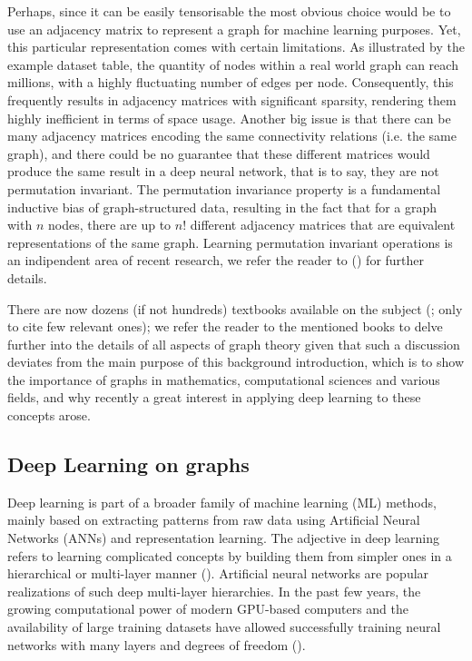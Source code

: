 \documentclass[binding=0.6cm]{sapthesis}
\newcommand{\mycite}[1]{(\cite{#1})}
\begin{document}
Perhaps, since it can be easily tensorisable the most obvious choice would be to use an adjacency matrix to represent a graph for machine learning purposes. Yet, this particular representation comes with certain limitations. As illustrated by the example dataset table, the quantity of nodes within a real world graph can reach millions, with a highly fluctuating number of edges per node. Consequently, this frequently results in adjacency matrices with significant sparsity, rendering them highly inefficient in terms of space usage. Another big issue is that there can be many adjacency matrices encoding the same connectivity relations (i.e. the same graph), and there could be no guarantee that these different matrices would produce the same result in a deep neural network, that is to say, they are not permutation invariant. The permutation invariance property is a fundamental inductive bias of graph-structured data, resulting in the fact that for a graph with $n$ nodes, there are up to $n!$ different adjacency matrices that are equivalent representations of the same graph. Learning permutation invariant operations is an indipendent area of recent research, we refer the reader to \mycite{mena2018learning,murphy2019janossy} for further details.

There are now dozens (if not hundreds) textbooks available on the subject (\cite{griffin2023applied,cormen2022introduction,diestel2017graph,bondy2011graph,berge1976graphs}; only to cite few relevant ones); we refer the reader to the mentioned books to delve further into the details of all aspects of graph theory given that such a discussion deviates from the main purpose of this background introduction, which is to show the importance of graphs in mathematics, computational sciences and various fields, and why recently a great interest in applying deep learning to these concepts arose. 

\subsection{Deep Learning on graphs}
\label{sec:bg.gnn.DL-on-graphs}
Deep learning is part of a broader family of machine learning (ML) methods, mainly based on extracting patterns from raw data using Artificial Neural Networks (ANNs) and representation learning. The adjective  in deep learning refers to learning complicated concepts by building them from simpler ones in a hierarchical or multi-layer manner \mycite{LeCun2015DeepL}. Artificial neural networks are popular realizations of such deep multi-layer hierarchies. In the past few years, the growing computational power of modern GPU-based computers and the availability of large training datasets have allowed successfully training neural networks with many layers and degrees of freedom \mycite{Bronstein_2017}.
\end{document}
